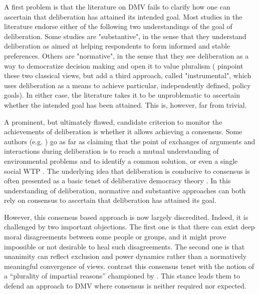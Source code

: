 \documentclass[version=3.21, pagesize, twoside=off, bibliography=totoc, DIV=calc, fontsize=12pt, a4paper, french, english]{scrartcl}
\begin{document}
{A first problem is that the literature on DMV fails to clarify how one can ascertain that deliberation has attained its intended goal. Most studies in the literature endorse either of the following two understandings of the goal of deliberation. Some studies are "substantive", in the sense that they understand deliberation as aimed at helping respondents to form informed and stable preferences. Others are "normative", in the sense that they see deliberation as a way to democratize decision making and open it to value pluralism (\cite{schaafsma_guidance_2018} pinpoint these two classical views, but add a third approach, called "instrumental", which uses deliberation as a means to achieve particular, independently defined, policy goals). In either case, the literature takes it to be unproblematic to ascertain whether the intended goal has been attained. This is, however, far from trivial.

A prominent, but ultimately flawed, candidate criterion to monitor the achievements of deliberation is whether it allows achieving a consensus. Some authors (e.g. \citet{vatn_institutional_2009}) go as far as claiming that the point of exchanges of arguments and interactions during deliberation is to reach a mutual understanding of environmental problems and to identify a common solution, or even a single social WTP \citep{orchard-webb_deliberative_2016}. The underlying idea that deliberation is conducive to consensus is often presented as a basic tenet of deliberative democracy theory \citep{wilson_discourse-based_2002}. In this understanding of deliberation, normative and substantive approaches can both rely on consensus to ascertain that deliberation has attained its goal.

However, this consensus based approach is now largely discredited. Indeed, it is challenged by two important objections.
The first one is that there can exist deep moral disagreements \citep{dryzek_deliberative_2013} between some people or groups, and it might prove impossible or not desirable to heal such disagreements.
The second one is that unanimity can reflect exclusion and power dynamics \citep{elster_sour_1983,volker_exploring_2016,vargas_background_2016,vargas_problem_2017,murphy_comparing_2017} rather than a normatively meaningful convergence of views.
\citeauthor{bartkowski_beyond_2018} contrast this consensus tenet with the notion of a ``plurality of impartial reasons'' championed by \citet{sen_idea_2009}.
This stance leads them to defend an approach to DMV where consensus is neither required nor expected.

}
\end{document}
